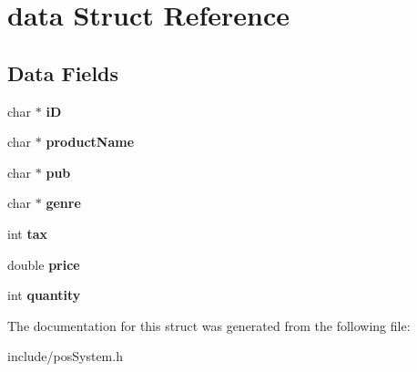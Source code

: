 \hypertarget{structdata}{}\section{data Struct Reference}
\label{structdata}
\subsection*{Data Fields}
\begin{DoxyCompactItemize}
\item 
\mbox{\label{structdata_af4e479353b5920d7bb2c59810ffb204f}} 
char $\ast$ {\bfseries iD}
\item 
\mbox{\label{structdata_a5bc119c1c3aabdfb0b07b66befc75e7c}} 
char $\ast$ {\bfseries product\+Name}
\item 
\mbox{\label{structdata_aab5e79ccf3cfb8dea0029eea6be38419}} 
char $\ast$ {\bfseries pub}
\item 
\mbox{\label{structdata_afd39d2a5f0192a3836ea8e6a272430a3}} 
char $\ast$ {\bfseries genre}
\item 
\mbox{\label{structdata_a0e20dc6034c9ab7263223d3b61cf66fd}} 
int {\bfseries tax}
\item 
\mbox{\label{structdata_a80d1e9b73edf0b6c8aa055cb5cdaa2f2}} 
double {\bfseries price}
\item 
\mbox{\label{structdata_ae6969e17e31c17a28dbf801f91acacfb}} 
int {\bfseries quantity}
\end{DoxyCompactItemize}


The documentation for this struct was generated from the following file\+:\begin{DoxyCompactItemize}
\item 
include/pos\+System.\+h\end{DoxyCompactItemize}
